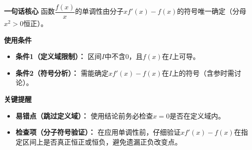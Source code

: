 \begin{summarybox}
	\textbf{\textcolor{CSummary}{一句话核心}}
	函数$\dfrac{f(x)}{x}$的单调性由分子$x f'(x)-f(x)$的符号唯一确定（分母$x^{2}>0$恒正）。

	\medskip
	\textbf{\textcolor{CSummary}{使用条件}}
	\begin{itemize}[leftmargin=*, itemsep=0.5em, topsep=0.4em]
		\item \textbf{条件1（定义域限制）：} 区间$I$中不含$0$，且$f(x)$在$I$上可导。
		\item \textbf{条件2（符号分析）：} 需能确定$x f'(x)-f(x)$在$I$上的符号（含参时需讨论）。
	\end{itemize}

	\medskip
	\textbf{\textcolor{CSummary}{关键提醒}}
	\begin{itemize}[leftmargin=*, itemsep=0.5em, topsep=0.4em]
		\item \textbf{易错点（跳过定义域）：} 使用结论前务必检查$x=0$是否在定义域内。
		\item \textbf{检查项（分子符号验证）：} 在应用单调性前，仔细验证$x f'(x)-f(x)$在指定区间上是否真正恒正或恒负，避免遗漏正负改变点。
	\end{itemize}

\end{summarybox}

